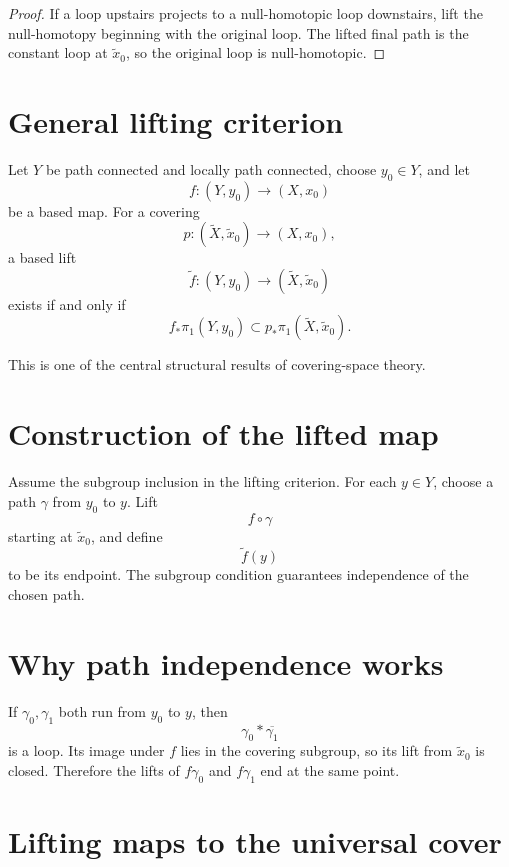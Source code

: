 \begin{proof}
If a loop upstairs projects to a null-homotopic loop downstairs, lift the
null-homotopy beginning with the original loop.  The lifted final path is the
constant loop at \(\tilde x_0\), so the original loop is null-homotopic.
\end{proof}

\section{General lifting criterion}

\begin{theorem}
\label{thm:viii11-general-criterion}
Let \(Y\) be path connected and locally path connected, choose \(y_0\in Y\),
and let
\[
f:(Y,y_0)\to(X,x_0)
\]
be a based map.  For a covering
\[
p:(\widetilde X,\tilde x_0)\to(X,x_0),
\]
a based lift
\[
\widetilde f:(Y,y_0)\to(\widetilde X,\tilde x_0)
\]
exists if and only if
\[
f_*\pi_1(Y,y_0)
\subset
p_*\pi_1(\widetilde X,\tilde x_0).
\]
\end{theorem}

This is one of the central structural results of covering-space theory.

\section{Construction of the lifted map}

Assume the subgroup inclusion in the lifting criterion.  For each \(y\in Y\),
choose a path \(\gamma\) from \(y_0\) to \(y\).  Lift
\[
f\circ\gamma
\]
starting at \(\tilde x_0\), and define
\[
\widetilde f(y)
\]
to be its endpoint.  The subgroup condition guarantees independence of the
chosen path.

\section{Why path independence works}

If \(\gamma_0,\gamma_1\) both run from \(y_0\) to \(y\), then
\[
\gamma_0*\overline{\gamma_1}
\]
is a loop.  Its image under \(f\) lies in the covering subgroup, so its lift
from \(\tilde x_0\) is closed.  Therefore the lifts of \(f\gamma_0\) and
\(f\gamma_1\) end at the same point.

\section{Lifting maps to the universal cover}

